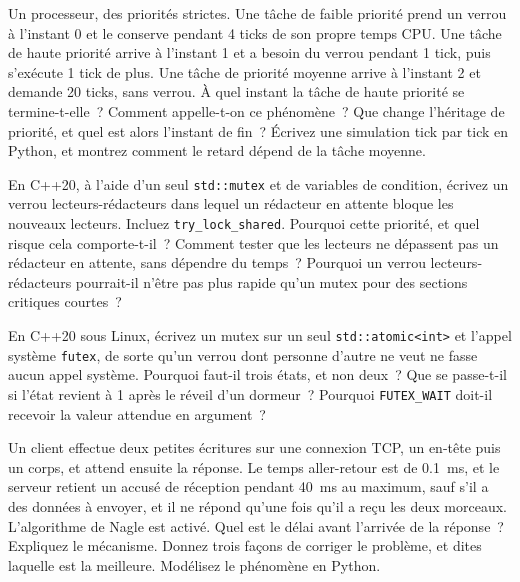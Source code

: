 \begin{question}\label{iq:iv3:operating-systems-concurrency-and-networks:29}
Un processeur, des priorités strictes. Une tâche de faible priorité prend un verrou à l'instant 0 et le conserve pendant 4 ticks de son propre temps CPU. Une tâche de haute priorité arrive à l'instant 1 et a besoin du verrou pendant 1 tick, puis s'exécute 1 tick de plus. Une tâche de priorité moyenne arrive à l'instant 2 et demande 20 ticks, sans verrou. À quel instant la tâche de haute priorité se termine-t-elle~? Comment appelle-t-on ce phénomène~? Que change l'héritage de priorité, et quel est alors l'instant de fin~? Écrivez une simulation tick par tick en Python, et montrez comment le retard dépend de la tâche moyenne.
\end{question}

\begin{question}\label{iq:iv3:operating-systems-concurrency-and-networks:30}
En C++20, à l'aide d'un seul \texttt{std::mutex} et de variables de condition, écrivez un verrou lecteurs-rédacteurs dans lequel un rédacteur en attente bloque les nouveaux lecteurs. Incluez \texttt{try\_lock\_shared}. Pourquoi cette priorité, et quel risque cela comporte-t-il~? Comment tester que les lecteurs ne dépassent pas un rédacteur en attente, sans dépendre du temps~? Pourquoi un verrou lecteurs-rédacteurs pourrait-il n'être pas plus rapide qu'un mutex pour des sections critiques courtes~?
\end{question}

\begin{question}\label{iq:iv3:operating-systems-concurrency-and-networks:31}
En C++20 sous Linux, écrivez un mutex sur un seul \texttt{std::atomic<int>} et l'appel système \texttt{futex}, de sorte qu'un verrou dont personne d'autre ne veut ne fasse aucun appel système. Pourquoi faut-il trois états, et non deux~? Que se passe-t-il si l'état revient à 1 après le réveil d'un dormeur~? Pourquoi \texttt{FUTEX\_WAIT} doit-il recevoir la valeur attendue en argument~?
\end{question}

\begin{question}\label{iq:iv3:operating-systems-concurrency-and-networks:32}
Un client effectue deux petites écritures sur une connexion TCP, un en-tête puis un corps, et attend ensuite la réponse. Le temps aller-retour est de 0.1~ms, et le serveur retient un accusé de réception pendant 40~ms au maximum, sauf s'il a des données à envoyer, et il ne répond qu'une fois qu'il a reçu les deux morceaux. L'algorithme de Nagle est activé. Quel est le délai avant l'arrivée de la réponse~? Expliquez le mécanisme. Donnez trois façons de corriger le problème, et dites laquelle est la meilleure. Modélisez le phénomène en Python.
\end{question}

